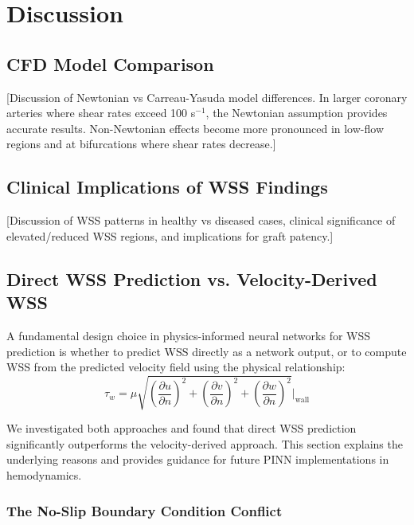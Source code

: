 \documentclass[12pt,a4paper]{article}
\newcommand{\wss}{\tau_w}
\begin{document}
\section{Discussion}

\subsection{CFD Model Comparison}

[Discussion of Newtonian vs Carreau-Yasuda model differences. In larger coronary arteries where shear rates exceed 100 s$^{-1}$, the Newtonian assumption provides accurate results. Non-Newtonian effects become more pronounced in low-flow regions and at bifurcations where shear rates decrease.]

\subsection{Clinical Implications of WSS Findings}

[Discussion of WSS patterns in healthy vs diseased cases, clinical significance of elevated/reduced WSS regions, and implications for graft patency.]

\subsection{Direct WSS Prediction vs. Velocity-Derived WSS}

A fundamental design choice in physics-informed neural networks for WSS prediction is whether to predict WSS directly as a network output, or to compute WSS from the predicted velocity field using the physical relationship:
\begin{equation}
    \wss = \mu \sqrt{\left(\frac{\partial u}{\partial n}\right)^2 + \left(\frac{\partial v}{\partial n}\right)^2 + \left(\frac{\partial w}{\partial n}\right)^2} \bigg|_{\text{wall}}
    \label{eq:wss_from_velocity}
\end{equation}

We investigated both approaches and found that direct WSS prediction significantly outperforms the velocity-derived approach. This section explains the underlying reasons and provides guidance for future PINN implementations in hemodynamics.

\subsubsection{The No-Slip Boundary Condition Conflict}
\end{document}

